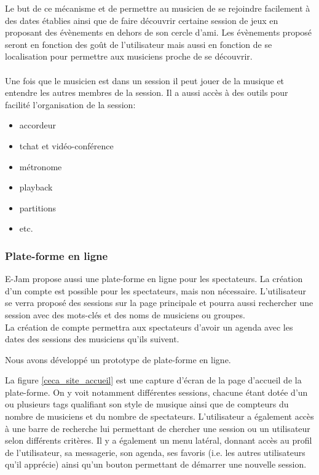 \documentclass[a4,12pt]{article}
\begin{document}
\begin{itemize}
    Le but de ce mécanisme et de permettre au musicien de se rejoindre facilement à des dates établies ainsi que de faire découvrir certaine session de jeux en proposant des évènements en dehors de son cercle d’ami. Les évènements proposé seront en fonction des goût de l’utilisateur mais aussi en fonction de se localisation pour permettre aux musiciens proche de se découvrir.\\
    \\
    Une fois que le musicien est dans un session il peut jouer de la musique et entendre les autres membres de la session. Il a aussi accès à des outils pour facilité l’organisation de la session:
    \begin{itemize}
        \item accordeur
        \item tchat et vidéo-conférence
        \item métronome
        \item playback
        \item partitions
        \item etc.
    \end{itemize}
\end{itemize}
\subsubsection{Plate-forme en ligne}
E-Jam propose aussi une plate-forme en ligne pour les spectateurs. La création d'un compte est possible pour les spectateurs, mais non nécessaire. L’utilisateur se verra proposé des sessions sur la page principale et pourra aussi rechercher une session avec des mots-clés et des noms de musiciens ou groupes.\\
La création de compte permettra aux spectateurs d’avoir un agenda avec les dates des sessions des musiciens qu’ils suivent.

Nous avons développé un prototype de plate-forme en ligne.

La figure \ref{ceca_site_accueil} est une capture d'écran de la page d'accueil de
la plate-forme. On y voit notamment différentes sessions, chacune étant dotée d'un
ou plusieurs tags qualifiant son style de musique ainsi que de compteurs du nombre
de musiciens et du nombre de spectateurs. L'utilisateur a également accès à une
barre de recherche lui permettant de chercher une session ou un utilisateur selon
différents critères. Il y a également un menu latéral, donnant accès au profil de
l'utilisateur, sa messagerie, son agenda, ses favoris (i.e. les autres utilisateurs
qu'il apprécie) ainsi qu'un bouton permettant de démarrer une nouvelle session.
\end{document}
